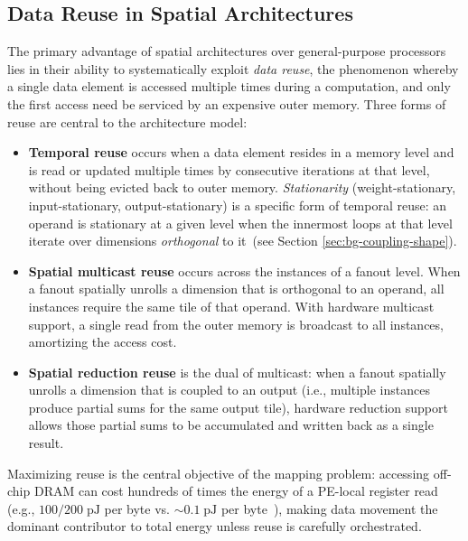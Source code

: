 \subsection{Data Reuse in Spatial Architectures}
\label{sec:data-reuse}

The primary advantage of spatial architectures over general-purpose
processors lies in their ability to systematically exploit
\emph{data reuse}, the phenomenon whereby a single data element
is accessed multiple times during a computation, and only the first
access need be serviced by an expensive outer memory.
Three forms of reuse are central to the architecture model:

\begin{itemize}
  \item \textbf{Temporal reuse} occurs when a data element resides in a
    memory level and is read or updated multiple times by consecutive
    iterations at that level, without being evicted back to outer memory.
     \emph{Stationarity} (weight-stationary,
    input-stationary, output-stationary) is a specific form of temporal
    reuse: an operand is stationary at a given level when the innermost
    loops at that level iterate over dimensions \emph{orthogonal} to
    it~(see Section \ref{sec:bg-coupling-shape}).

  \item \textbf{Spatial multicast reuse} occurs across the instances
    of a fanout level.
    When a fanout spatially unrolls a dimension that is orthogonal to
    an operand, all instances require the same tile of that operand.
    With hardware multicast support, a single read from the outer memory
    is broadcast to all instances, amortizing the access cost.

  \item \textbf{Spatial reduction reuse} is the dual of multicast:
    when a fanout spatially unrolls a dimension that is coupled to an
    output (i.e., multiple instances produce partial sums for the same
    output tile), hardware reduction support allows those partial sums
    to be accumulated and written back as a single result.
\end{itemize}

Maximizing reuse is the central objective of the mapping problem:
accessing off-chip DRAM can cost hundreds of times the energy
of a PE-local register read (e.g., $100/200\;\text{pJ}$ per byte vs.
${\sim}0.1\;\text{pJ}$ per byte~\cite{eyeriss}), making data
movement the dominant contributor to total energy unless reuse is
carefully orchestrated.


